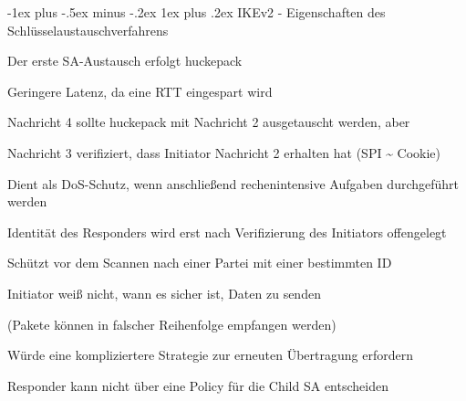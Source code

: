 \documentclass[a4paper]{article}
\makeatletter
\renewcommand{\subsubsection}{\@startsection{subsubsection}{3}{0mm}%
 {-1ex plus -.5ex minus -.2ex}%
 {1ex plus .2ex}%
 {\normalfont\small\bfseries}}
\makeatother
\begin{document}
\begin{multicols}{3}
\begin{itemize*}
            \subsubsection{IKEv2 - Eigenschaften des Schlüsselaustauschverfahrens}
            \begin{itemize*}
                  \item Der erste SA-Austausch erfolgt huckepack
                  \begin{itemize*}
                        \item Geringere Latenz, da eine RTT eingespart wird
                  \end{itemize*}
                  \item Nachricht 4 sollte huckepack mit Nachricht 2 ausgetauscht werden, aber
                  \begin{itemize*}
                        \item Nachricht 3 verifiziert, dass Initiator Nachricht 2 erhalten hat (SPI \textasciitilde{} Cookie)
                        \begin{itemize*}
                              \item Dient als DoS-Schutz, wenn anschließend rechenintensive Aufgaben durchgeführt werden
                        \end{itemize*}
                        \item Identität des Responders wird erst nach Verifizierung des Initiators offengelegt
                        \begin{itemize*}
                              \item Schützt vor dem Scannen nach einer Partei mit einer bestimmten ID
                        \end{itemize*}
                        \item Initiator weiß nicht, wann es sicher ist, Daten zu senden
                        \begin{itemize*}
                              \item (Pakete können in falscher Reihenfolge empfangen werden)
                        \end{itemize*}
                        \item Würde eine kompliziertere Strategie zur erneuten Übertragung erfordern
                        \item Responder kann nicht über eine Policy für die Child SA entscheiden
                  \end{itemize*}
            \end{itemize*}


\end{itemize*}
\end{multicols}
\end{document}
